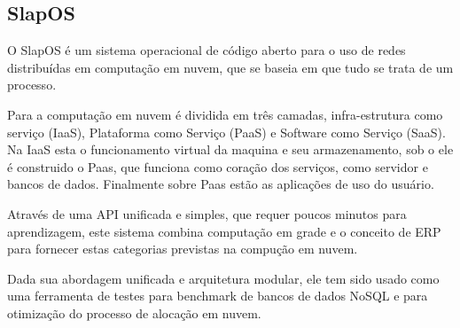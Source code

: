 \subsection{SlapOS}

O SlapOS é um sistema operacional de código aberto para o uso de redes distribuídas em computação em nuvem, que se baseia em que tudo se trata de um processo.

Para \cite{SMETS-CERIN-COURTEAUD} a computação em nuvem é dividida em três camadas, infra-estrutura como serviço (IaaS), Plataforma como Serviço (PaaS) e Software como Serviço (SaaS). Na IaaS esta o funcionamento virtual da maquina e seu armazenamento, sob o ele é construido o Paas, que funciona como coração dos serviços, como servidor e bancos de dados. Finalmente sobre Paas estão as aplicações de uso do usuário.

Através de uma API unificada e simples, que requer poucos minutos para aprendizagem, este sistema combina computação em grade e o conceito de ERP para fornecer estas categorias previstas na compução em nuvem.

Dada sua abordagem unificada e arquitetura modular, ele tem sido usado como uma ferramenta de testes para benchmark de bancos de dados NoSQL e para otimização do processo de alocação em nuvem.

